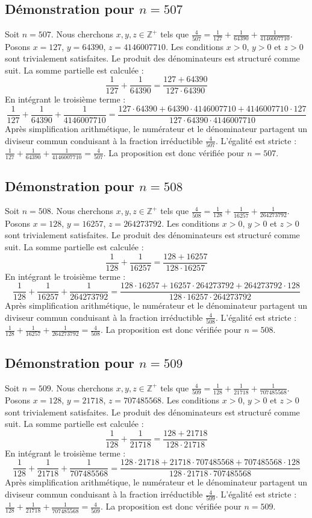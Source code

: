 \documentclass[11pt,a4paper]{article}
\begin{document}
\subsection{Démonstration pour $n = 507$}
Soit $n = 507$. Nous cherchons $x, y, z \in \mathbb{Z}^{+}$ tels que $\frac{4}{507} = \frac{1}{127} + \frac{1}{64390} + \frac{1}{4146007710}$.
Posons $x = 127$, $y = 64390$, $z = 4146007710$.
Les conditions $x > 0$, $y > 0$ et $z > 0$ sont trivialement satisfaites.
Le produit des dénominateurs est structuré comme suit. La somme partielle est calculée :
$$ \frac{1}{127} + \frac{1}{64390} = \frac{127+64390}{127 \cdot 64390} $$
En intégrant le troisième terme :
$$ \frac{1}{127} + \frac{1}{64390} + \frac{1}{4146007710} = \frac{127 \cdot 64390 + 64390 \cdot 4146007710 + 4146007710 \cdot 127}{127 \cdot 64390 \cdot 4146007710} $$
Après simplification arithmétique, le numérateur et le dénominateur partagent un diviseur commun conduisant à la fraction irréductible $\frac{4}{507}$.
L'égalité est stricte : $\frac{1}{127} + \frac{1}{64390} + \frac{1}{4146007710} = \frac{4}{507}$.
La proposition est donc vérifiée pour $n = 507$.
\subsection{Démonstration pour $n = 508$}
Soit $n = 508$. Nous cherchons $x, y, z \in \mathbb{Z}^{+}$ tels que $\frac{4}{508} = \frac{1}{128} + \frac{1}{16257} + \frac{1}{264273792}$.
Posons $x = 128$, $y = 16257$, $z = 264273792$.
Les conditions $x > 0$, $y > 0$ et $z > 0$ sont trivialement satisfaites.
Le produit des dénominateurs est structuré comme suit. La somme partielle est calculée :
$$ \frac{1}{128} + \frac{1}{16257} = \frac{128+16257}{128 \cdot 16257} $$
En intégrant le troisième terme :
$$ \frac{1}{128} + \frac{1}{16257} + \frac{1}{264273792} = \frac{128 \cdot 16257 + 16257 \cdot 264273792 + 264273792 \cdot 128}{128 \cdot 16257 \cdot 264273792} $$
Après simplification arithmétique, le numérateur et le dénominateur partagent un diviseur commun conduisant à la fraction irréductible $\frac{4}{508}$.
L'égalité est stricte : $\frac{1}{128} + \frac{1}{16257} + \frac{1}{264273792} = \frac{4}{508}$.
La proposition est donc vérifiée pour $n = 508$.
\subsection{Démonstration pour $n = 509$}
Soit $n = 509$. Nous cherchons $x, y, z \in \mathbb{Z}^{+}$ tels que $\frac{4}{509} = \frac{1}{128} + \frac{1}{21718} + \frac{1}{707485568}$.
Posons $x = 128$, $y = 21718$, $z = 707485568$.
Les conditions $x > 0$, $y > 0$ et $z > 0$ sont trivialement satisfaites.
Le produit des dénominateurs est structuré comme suit. La somme partielle est calculée :
$$ \frac{1}{128} + \frac{1}{21718} = \frac{128+21718}{128 \cdot 21718} $$
En intégrant le troisième terme :
$$ \frac{1}{128} + \frac{1}{21718} + \frac{1}{707485568} = \frac{128 \cdot 21718 + 21718 \cdot 707485568 + 707485568 \cdot 128}{128 \cdot 21718 \cdot 707485568} $$
Après simplification arithmétique, le numérateur et le dénominateur partagent un diviseur commun conduisant à la fraction irréductible $\frac{4}{509}$.
L'égalité est stricte : $\frac{1}{128} + \frac{1}{21718} + \frac{1}{707485568} = \frac{4}{509}$.
La proposition est donc vérifiée pour $n = 509$.
\end{document}
